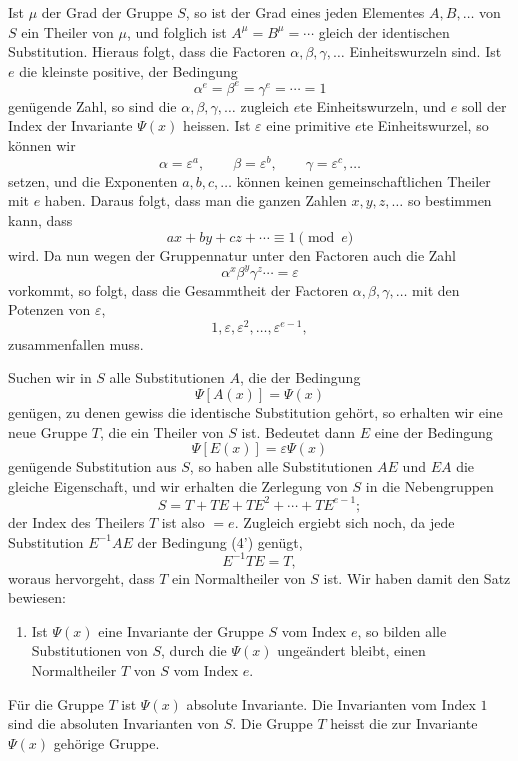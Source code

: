 \documentclass[11pt]{article}
\begin{document}
Ist $\mu$ der Grad der Gruppe $S$, so ist der Grad eines jeden Elementes $A,B,\ldots$ von $S$ ein Theiler von $\mu$, und folglich ist $A^\mu=B^\mu=\cdots$ gleich der identischen Substitution. Hieraus folgt, dass die Factoren $\alpha,\beta,\gamma,\ldots$ Einheitswurzeln sind. Ist $e$ die kleinste positive, der Bedingung
\begin{equation}
\alpha^e=\beta^e=\gamma^e=\cdots=1
\tag{5}
\end{equation}
genügende Zahl, so sind die $\alpha,\beta,\gamma,\ldots$ zugleich $e$te Einheitswurzeln, und $e$ soll der Index der Invariante $\Psi(x)$ heissen. Ist $\varepsilon$ eine primitive $e$te Einheitswurzel, so können wir
\[
\alpha=\varepsilon^a,
\qquad
\beta=\varepsilon^b,
\qquad
\gamma=\varepsilon^c,
\ldots
\]
setzen, und die Exponenten $a,b,c,\ldots$ können keinen gemeinschaftlichen Theiler mit $e$ haben. Daraus folgt, dass man die ganzen Zahlen $x,y,z,\ldots$ so bestimmen kann, dass
\[
ax+by+cz+\cdots\equiv1\pmod e
\]
wird. Da nun wegen der Gruppennatur unter den Factoren auch die Zahl
\[
\alpha^x\beta^y\gamma^z\cdots=\varepsilon
\]
vorkommt, so folgt, dass die Gesammtheit der Factoren $\alpha,\beta,\gamma,\ldots$ mit den Potenzen von $\varepsilon$,
\[
1,\varepsilon,\varepsilon^2,\ldots,\varepsilon^{e-1},
\]
zusammenfallen muss.

Suchen wir in $S$ alle Substitutionen $A$, die der Bedingung
\begin{equation}
\Psi[A(x)]=\Psi(x)
\tag{4'}
\end{equation}
genügen, zu denen gewiss die identische Substitution gehört, so erhalten wir eine neue Gruppe $T$, die ein Theiler von $S$ ist. Bedeutet dann $E$ eine der Bedingung
\begin{equation}
\Psi[E(x)]=\varepsilon\Psi(x)
\tag{5'}
\end{equation}
genügende Substitution aus $S$, so haben alle Substitutionen $AE$ und $EA$ die gleiche Eigenschaft, und wir erhalten die Zerlegung von $S$ in die Nebengruppen
\begin{equation}
S=T+TE+TE^2+\cdots+TE^{e-1};
\tag{6}
\end{equation}
der Index des Theilers $T$ ist also $=e$. Zugleich ergiebt sich noch, da jede Substitution $E^{-1}AE$ der Bedingung (4') genügt,
\begin{equation}
E^{-1}TE=T,
\tag{7}
\end{equation}
woraus hervorgeht, dass $T$ ein Normaltheiler von $S$ ist. Wir haben damit den Satz bewiesen:
\begin{enumerate}[label=\arabic*.,leftmargin=2.2em,start=3]
\item Ist $\Psi(x)$ eine Invariante der Gruppe $S$ vom Index $e$, so bilden alle Substitutionen von $S$, durch die $\Psi(x)$ ungeändert bleibt, einen Normaltheiler $T$ von $S$ vom Index $e$.
\end{enumerate}
Für die Gruppe $T$ ist $\Psi(x)$ absolute Invariante. Die Invarianten vom Index $1$ sind die absoluten Invarianten von $S$. Die Gruppe $T$ heisst die zur Invariante $\Psi(x)$ gehörige Gruppe.
\end{document}
